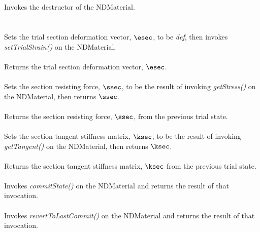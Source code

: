  \\
\\ 
Invokes the destructor of the NDMaterial. \\

 \\
  \\
Sets the trial section deformation vector, $\esec$, to be {\em def}, then invokes
{\em setTrialStrain()} on the NDMaterial. \\

 \\
Returns the trial section deformation vector, $\esec$. \\

 \\
Sets the section resisting force, $\ssec$, to be the result of invoking 
{\em getStress()} on the NDMaterial, then returns $\ssec$. \\

 \\
Returns the section resisting force, $\ssec$, from the previous trial state. \\

 \\
Sets the section tangent stiffness matrix, $\ksec$, to be the result of
invoking {\em getTangent()} on the NDMaterial, then returns $\ksec$. \\

 \\
Returns the section tangent stiffness matrix, $\ksec$ from the previous trial state. \\

 \\
Invokes {\em commitState()} on the NDMaterial and returns the
result of that invocation. \\

 \\
Invokes {\em revertToLastCommit()} on the NDMaterial and returns the
result of that invocation. \\

